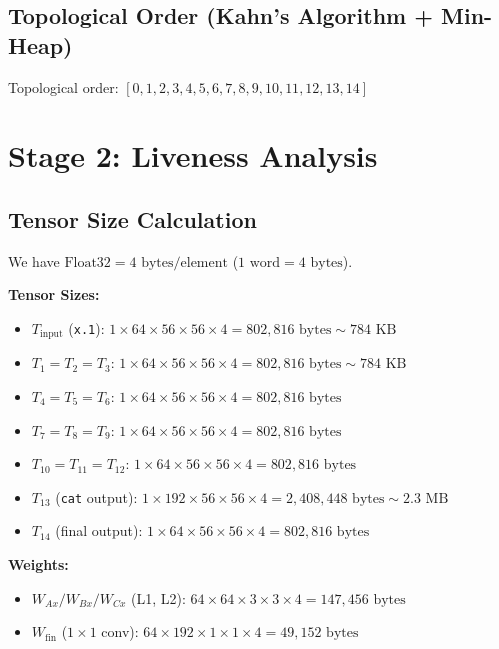 \documentclass[11pt,a4paper]{article}
\begin{document}
\subsection{Topological Order (Kahn's Algorithm + Min-Heap)}

Topological order: $[0, 1, 2, 3, 4, 5, 6, 7, 8, 9, 10, 11, 12, 13, 14]$

\section{Stage 2: Liveness Analysis}

\subsection{Tensor Size Calculation}

We have $\text{Float32} = 4\text{ bytes/element}$ ($1\text{ word} = 4\text{ bytes}$).

\textbf{Tensor Sizes:}
\begin{itemize}
    \item $T_{\text{input}}$ (\texttt{x.1}): $1 \times 64 \times 56 \times 56 \times 4 = 802,816\text{ bytes} \sim 784\text{ KB}$
    \item $T_1 = T_2 = T_3$: $1 \times 64 \times 56 \times 56 \times 4 = 802,816\text{ bytes} \sim 784\text{ KB}$
    \item $T_4 = T_5 = T_6$: $1 \times 64 \times 56 \times 56 \times 4 = 802,816\text{ bytes}$
    \item $T_7 = T_8 = T_9$: $1 \times 64 \times 56 \times 56 \times 4 = 802,816\text{ bytes}$
    \item $T_{10} = T_{11} = T_{12}$: $1 \times 64 \times 56 \times 56 \times 4 = 802,816\text{ bytes}$
    \item $T_{13}$ (\texttt{cat} output): $1 \times 192 \times 56 \times 56 \times 4 = 2,408,448\text{ bytes} \sim 2.3\text{ MB}$
    \item $T_{14}$ (final output): $1 \times 64 \times 56 \times 56 \times 4 = 802,816\text{ bytes}$
\end{itemize}

\textbf{Weights:}
\begin{itemize}
    \item $W_{Ax} / W_{Bx} / W_{Cx}$ (L1, L2): $64 \times 64 \times 3 \times 3 \times 4 = 147,456\text{ bytes}$
    \item $W_{\text{fin}}$ ($1\times 1$ conv): $64 \times 192 \times 1 \times 1 \times 4 = 49,152\text{ bytes}$
\end{itemize}
\end{document}
